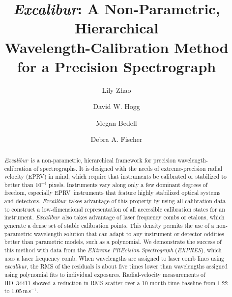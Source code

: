 \documentclass[twocolumn,table,xcolor,trackchanges]{aastex63}
\newcommand{\project}[1]{\textsl{#1}}
\newcommand{\name}{\project{excalibur}}
\newcommand{\Name}{\project{Excalibur}}
\newcommand{\acronym}[1]{{\small{#1}}}
\newcommand{\expres}{\project{\acronym{EXPRES}}}
\newcommand{\eprv}{\acronym{EPRV}}
\newcommand{\mps}{\mathrm{m\,s^{-1}}}
\begin{document}
\title{\Name:
  A Non-Parametric, Hierarchical \\
  Wavelength-Calibration Method for a Precision Spectrograph}


\author[0000-0002-3852-3590]{Lily Zhao}

\author[0000-0003-2866-9403]{David W. Hogg}

\author[0000-0001-9907-7742]{Megan Bedell}

\author[0000-0003-2221-0861]{Debra A. Fischer}

\begin{abstract}\noindent%
\Name\ is a non-parametric, hierarchical framework for precision wavelength-calibration of spectrographs.  It is designed with the needs of extreme-precision radial velocity (\eprv) in mind, which require that instruments be calibrated or stabilized to better than $10^{-4}$ pixels.  Instruments vary along only a few dominant degrees of freedom, especially \eprv\ instruments that feature highly stabilized optical systems and detectors.  \Name\ takes advantage of this property by using all calibration data to construct a low-dimensional representation of all accessible calibration states for an instrument.  \Name\ also takes advantage of laser frequency combs or etalons, which generate a dense set of stable calibration points.  This density permits the use of a non-parametric wavelength solution that can adapt to any instrument or detector oddities better than parametric models, such as a polynomial.  We demonstrate the success of this method with data from the \textsl{EXtreme PREcision Spectrograph} (\expres), which uses a laser frequency comb.  When wavelengths are assigned to laser comb lines using \name, the RMS of the residuals is about five times lower than wavelengths assigned using polynomial fits to individual exposures.  Radial-velocity measurements of HD~34411 showed a reduction in RMS scatter over a 10-month time baseline from $1.22$ to $1.05\, \mps$.
\end{abstract}
\end{document}
